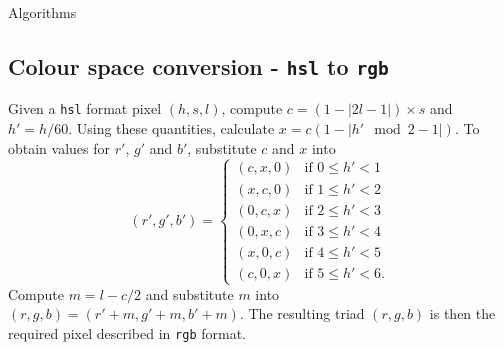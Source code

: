 \begin{chapter}{\label{app:algorithms}Algorithms}
\subsection{Colour space conversion - {\tt hsl} to {\tt rgb}}
Given a {\tt hsl} format pixel $(h,s,l)$, compute $c = (1 - | 2l - 1|) \times s$ and $h' = h/60$. Using these quantities, calculate $x = c(1-|h' \mod 2 - 1|)$. To obtain values for $r'$, $g'$ and $b'$, substitute $c$ and $x$ into
\begin{equation}
(r', g', b') =
    \begin{cases}
      (c, x, 0) &\mbox{if } 0 \leq h' < 1 \\
      (x, c, 0) &\mbox{if } 1 \leq h' < 2 \\
      (0, c, x) &\mbox{if } 2 \leq h' < 3 \\
      (0, x, c) &\mbox{if } 3 \leq h' < 4 \\
      (x, 0, c) &\mbox{if } 4 \leq h' < 5 \\
      (c, 0, x) &\mbox{if } 5 \leq h'< 6.
    \end{cases}
\end{equation}
Compute $m = l - c/2$ and substitute $m$ into $(r,g,b) = (r'+m,g'+m,b'+m)$. The resulting triad $(r,g,b)$ is then the required pixel described in {\tt rgb} format.


\end{chapter}
